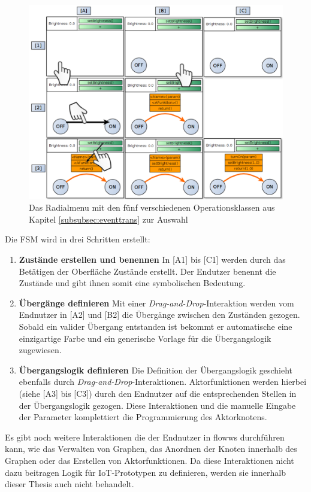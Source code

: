 \begin{figure}[h]
  \centering
  \includegraphics[width=1\textwidth]{bilder/chapter4/chapter4_3/createFsm.pdf}
  \caption{Das Radialmenu mit den fünf verschiedenen Operationsklassen aus Kapitel \ref{subsubsec:eventtrans} zur Auswahl}
  \label{fig:createFSMInteraction}
\end{figure}

Die \ac{FSM} wird in drei Schritten erstellt:
\begin{enumerate}
    \item \textbf{Zustände erstellen und benennen} In [A1] bis [C1] werden durch das Betätigen der Oberfläche Zustände erstellt. Der Endutzer benennt die Zustände und gibt ihnen somit eine symbolischen Bedeutung.
    \item \textbf{Übergänge definieren} Mit einer \textit{Drag-and-Drop}-Interaktion werden vom Endnutzer in [A2] und [B2] die Übergänge zwischen den Zuständen gezogen. Sobald ein valider Übergang entstanden ist bekommt er automatische eine einzigartige Farbe und ein generische Vorlage für die Übergangslogik zugewiesen.
    \item \textbf{Übergangslogik definieren} Die Definition der Übergangslogik geschieht ebenfalls durch \textit{Drag-and-Drop}-Interaktionen. Aktorfunktionen werden hierbei (siehe [A3] bis [C3]) durch den Endnutzer auf die entsprechenden Stellen in der Übergangslogik gezogen. Diese Interaktionen und die manuelle Eingabe der Parameter komplettiert die Programmierung des Aktorknotens.
\end{enumerate}

Es gibt noch weitere Interaktionen die der Endnutzer in flowws durchführen kann, wie das Verwalten von Graphen, das Anordnen der Knoten innerhalb des Graphen oder das Erstellen von Aktorfunktionen. Da diese Interaktionen nicht dazu beitragen Logik für \ac{IoT}-Prototypen zu definieren, werden sie innerhalb dieser Thesis auch nicht behandelt.